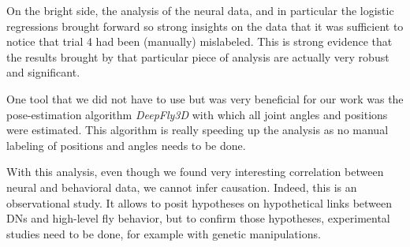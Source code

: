 On the bright side, the analysis of the neural data, and in particular the logistic regressions brought forward so strong insights on the data that it was sufficient to notice that trial 4 had been (manually) mislabeled.
This is strong evidence that the results brought by that particular piece of analysis are actually very robust and significant.

\vspace{\baselineskip}

One tool that we did not have to use but was very beneficial for our work was the pose-estimation algorithm \textit{DeepFly3D} with which all joint angles and positions were estimated.
This algorithm is really speeding up the analysis as no manual labeling of positions and angles needs to be done.  

\vspace{\baselineskip}

With this analysis, even though we found very interesting correlation between neural and behavioral data, we cannot infer causation.
Indeed, this is an observational study.
It allows to posit hypotheses on hypothetical links between DNs and high-level fly behavior, but to confirm those hypotheses, experimental studies need to be done, for example with genetic manipulations.
